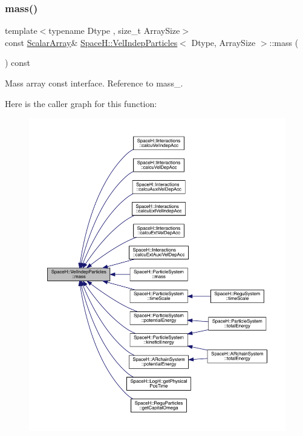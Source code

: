 \subsubsection{\texorpdfstring{mass()}{mass()}\hspace{0.1cm}{\footnotesize\ttfamily [1/2]}}
{\footnotesize\ttfamily template$<$typename Dtype , size\+\_\+t Array\+Size$>$ \\
const \mbox{\hyperlink{class_space_h_1_1_vel_indep_particles_ab5efeef52fb5748c25fbfeb04b64640e}{Scalar\+Array}}\& \mbox{\hyperlink{class_space_h_1_1_vel_indep_particles}{Space\+H\+::\+Vel\+Indep\+Particles}}$<$ Dtype, Array\+Size $>$\+::mass (\begin{DoxyParamCaption}{ }\end{DoxyParamCaption}) const\hspace{0.3cm}{\ttfamily [inline]}}



Mass array const interface. Reference to mass\+\_\+. 

Here is the caller graph for this function\+:
\nopagebreak
\begin{figure}[H]
\begin{center}
\leavevmode
\includegraphics[width=350pt]{class_space_h_1_1_vel_indep_particles_a9d8196bf1fe404e6c50ae20a11398076_icgraph}
\end{center}
\end{figure}
\mbox{\label{class_space_h_1_1_vel_indep_particles_a5e35094133e5409570e83d00c922df6a}} 
